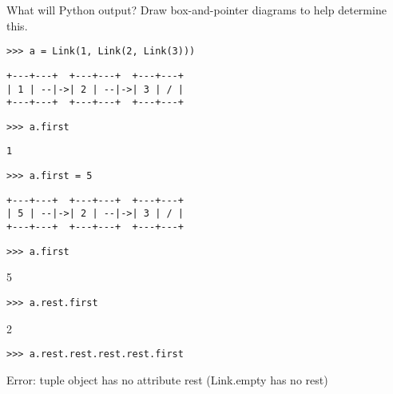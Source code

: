 \begin{blocksection}
\question What will Python output? Draw box-and-pointer diagrams to help determine this.

\begin{lstlisting}
>>> a = Link(1, Link(2, Link(3)))
\end{lstlisting}
\begin{solution}[0in]
\begin{lstlisting}
+---+---+  +---+---+  +---+---+
| 1 | --|->| 2 | --|->| 3 | / |
+---+---+  +---+---+  +---+---+
\end{lstlisting}
\end{solution}

\begin{lstlisting}
>>> a.first
\end{lstlisting}
\begin{solution}[.25in]
\begin{lstlisting}
1
\end{lstlisting}
\end{solution}

\begin{lstlisting}
>>> a.first = 5
\end{lstlisting}
\begin{solution}[0in]
\begin{lstlisting}
+---+---+  +---+---+  +---+---+
| 5 | --|->| 2 | --|->| 3 | / |
+---+---+  +---+---+  +---+---+
\end{lstlisting}
\end{solution}

\begin{lstlisting}
>>> a.first
\end{lstlisting}
\begin{solution}[.25in]
5
\end{solution}

\begin{lstlisting}
>>> a.rest.first
\end{lstlisting}
\begin{solution}[.25in]
2
\end{solution}

\begin{lstlisting}
>>> a.rest.rest.rest.rest.first
\end{lstlisting}
\begin{solution}[.25in]
Error: tuple object has no attribute rest (Link.empty has no rest)
\end{solution}
\end{blocksection}

